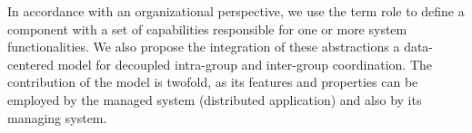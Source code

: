 In accordance with an organizational perspective, we use the term role to define a component with a set of capabilities responsible for one or more system functionalities. We also propose the integration of these abstractions a data-centered model for decoupled intra-group and inter-group coordination. The contribution of the model is twofold, as its features and properties can be employed by the managed system (distributed application) and also by its managing system.










